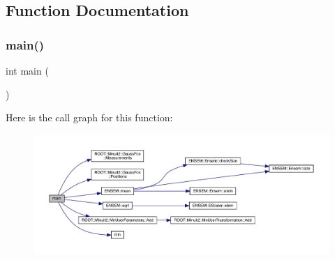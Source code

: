 \subsection{Function Documentation}
\mbox{\label{adat-devel_2other__libs_2minuit_2test_2MnSim_2PaulTest_8cxx_ae66f6b31b5ad750f1fe042a706a4e3d4}} 
\subsubsection{\texorpdfstring{main()}{main()}}
{\footnotesize\ttfamily int main (\begin{DoxyParamCaption}{ }\end{DoxyParamCaption})}

Here is the call graph for this function\+:
\nopagebreak
\begin{figure}[H]
\begin{center}
\leavevmode
\includegraphics[width=350pt]{d4/de1/adat-devel_2other__libs_2minuit_2test_2MnSim_2PaulTest_8cxx_ae66f6b31b5ad750f1fe042a706a4e3d4_cgraph}
\end{center}
\end{figure}
